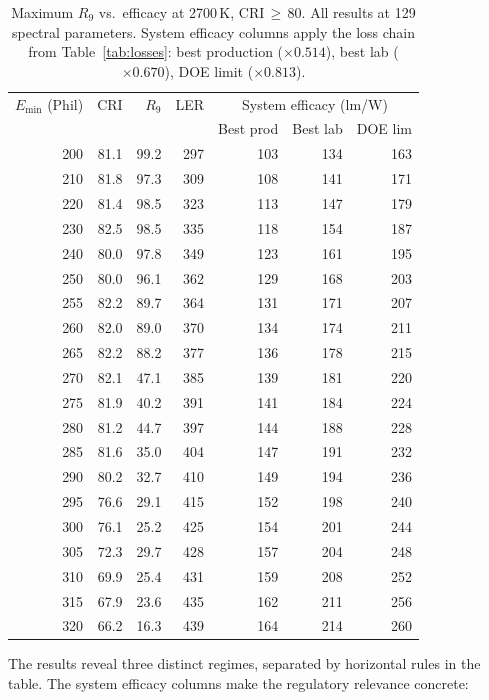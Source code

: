 \documentclass[11pt]{article}
\begin{document}
\begin{table}[H]
\centering
\caption{Maximum $R_9$ vs.\ efficacy at 2700\,K, CRI\,$\geq$\,80.
  All results at 129 spectral parameters.
  System efficacy columns apply the loss chain from Table~\ref{tab:losses}:
  best production ($\times 0.514$), best lab ($\times 0.670$),
  DOE limit ($\times 0.813$).}
\label{tab:cri80-sweep}
\begin{tabular}{rrrr|rrr}
\toprule
$E_{\min}$ (Phil) & CRI & $R_9$ & LER
  & \multicolumn{3}{c}{System efficacy (lm/W)} \\
  & & & & Best prod & Best lab & DOE lim \\
\midrule
200 & 81.1 & 99.2 & 297 & 103 & 134 & 163 \\
210 & 81.8 & 97.3 & 309 & 108 & 141 & 171 \\
220 & 81.4 & 98.5 & 323 & 113 & 147 & 179 \\
230 & 82.5 & 98.5 & 335 & 118 & 154 & 187 \\
240 & 80.0 & 97.8 & 349 & 123 & 161 & 195 \\
250 & 80.0 & 96.1 & 362 & 129 & 168 & 203 \\
255 & 82.2 & 89.7 & 364 & 131 & 171 & 207 \\
260 & 82.0 & 89.0 & 370 & 134 & 174 & 211 \\
265 & 82.2 & 88.2 & 377 & 136 & 178 & 215 \\
\midrule
270 & 82.1 & 47.1 & 385 & 139 & 181 & 220 \\
275 & 81.9 & 40.2 & 391 & 141 & 184 & 224 \\
280 & 81.2 & 44.7 & 397 & 144 & 188 & 228 \\
285 & 81.6 & 35.0 & 404 & 147 & 191 & 232 \\
290 & 80.2 & 32.7 & 410 & 149 & 194 & 236 \\
\midrule
295 & 76.6 & 29.1 & 415 & 152 & 198 & 240 \\
300 & 76.1 & 25.2 & 425 & 154 & 201 & 244 \\
305 & 72.3 & 29.7 & 428 & 157 & 204 & 248 \\
310 & 69.9 & 25.4 & 431 & 159 & 208 & 252 \\
315 & 67.9 & 23.6 & 435 & 162 & 211 & 256 \\
320 & 66.2 & 16.3 & 439 & 164 & 214 & 260 \\
\bottomrule
\end{tabular}
\end{table}

The results reveal three distinct regimes, separated by horizontal rules
in the table.  The system efficacy columns make the regulatory relevance
concrete:
\end{document}
